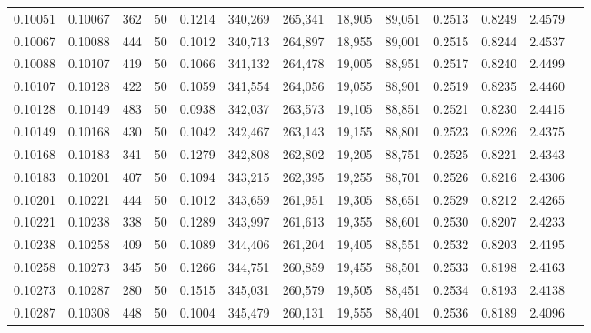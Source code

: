 \begin{tabular}{rrrrrrrrrrrrr}
0.10051 & 0.10067 &   362 &  50 &                                     0.1214 & 340,269 & 265,341 &  18,905 &  89,051 & 0.2513 & 0.8249 & 2.4579 \\
0.10067 & 0.10088 &   444 &  50 &                                     0.1012 & 340,713 & 264,897 &  18,955 &  89,001 & 0.2515 & 0.8244 & 2.4537 \\
0.10088 & 0.10107 &   419 &  50 &                                     0.1066 & 341,132 & 264,478 &  19,005 &  88,951 & 0.2517 & 0.8240 & 2.4499 \\
0.10107 & 0.10128 &   422 &  50 &                                     0.1059 & 341,554 & 264,056 &  19,055 &  88,901 & 0.2519 & 0.8235 & 2.4460 \\
0.10128 & 0.10149 &   483 &  50 &                                     0.0938 & 342,037 & 263,573 &  19,105 &  88,851 & 0.2521 & 0.8230 & 2.4415 \\
0.10149 & 0.10168 &   430 &  50 &                                     0.1042 & 342,467 & 263,143 &  19,155 &  88,801 & 0.2523 & 0.8226 & 2.4375 \\
0.10168 & 0.10183 &   341 &  50 &                                     0.1279 & 342,808 & 262,802 &  19,205 &  88,751 & 0.2525 & 0.8221 & 2.4343 \\
0.10183 & 0.10201 &   407 &  50 &                                     0.1094 & 343,215 & 262,395 &  19,255 &  88,701 & 0.2526 & 0.8216 & 2.4306 \\
0.10201 & 0.10221 &   444 &  50 &                                     0.1012 & 343,659 & 261,951 &  19,305 &  88,651 & 0.2529 & 0.8212 & 2.4265 \\
0.10221 & 0.10238 &   338 &  50 &                                     0.1289 & 343,997 & 261,613 &  19,355 &  88,601 & 0.2530 & 0.8207 & 2.4233 \\
0.10238 & 0.10258 &   409 &  50 &                                     0.1089 & 344,406 & 261,204 &  19,405 &  88,551 & 0.2532 & 0.8203 & 2.4195 \\
0.10258 & 0.10273 &   345 &  50 &                                     0.1266 & 344,751 & 260,859 &  19,455 &  88,501 & 0.2533 & 0.8198 & 2.4163 \\
0.10273 & 0.10287 &   280 &  50 &                                     0.1515 & 345,031 & 260,579 &  19,505 &  88,451 & 0.2534 & 0.8193 & 2.4138 \\
0.10287 & 0.10308 &   448 &  50 &                                     0.1004 & 345,479 & 260,131 &  19,555 &  88,401 & 0.2536 & 0.8189 & 2.4096 \\

\end{tabular}
